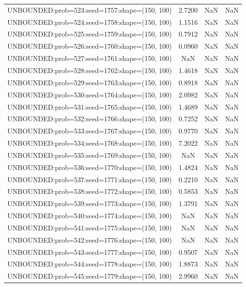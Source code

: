 \begin{longtable}{lccc}
UNBOUNDED:prob=523:seed=1757:shape=(150, 100) &  2.7200 &   NaN &    NaN \\
UNBOUNDED:prob=524:seed=1758:shape=(150, 100) &  1.1516 &   NaN &    NaN \\
UNBOUNDED:prob=525:seed=1759:shape=(150, 100) &  0.7912 &   NaN &    NaN \\
UNBOUNDED:prob=526:seed=1760:shape=(150, 100) &  0.0960 &   NaN &    NaN \\
UNBOUNDED:prob=527:seed=1761:shape=(150, 100) &     NaN &   NaN &    NaN \\
UNBOUNDED:prob=528:seed=1762:shape=(150, 100) &  1.4618 &   NaN &    NaN \\
UNBOUNDED:prob=529:seed=1763:shape=(150, 100) &  0.8918 &   NaN &    NaN \\
UNBOUNDED:prob=530:seed=1764:shape=(150, 100) &  2.0982 &   NaN &    NaN \\
UNBOUNDED:prob=531:seed=1765:shape=(150, 100) &  1.4689 &   NaN &    NaN \\
UNBOUNDED:prob=532:seed=1766:shape=(150, 100) &  0.7252 &   NaN &    NaN \\
UNBOUNDED:prob=533:seed=1767:shape=(150, 100) &  0.9770 &   NaN &    NaN \\
UNBOUNDED:prob=534:seed=1768:shape=(150, 100) &  7.2022 &   NaN &    NaN \\
UNBOUNDED:prob=535:seed=1769:shape=(150, 100) &     NaN &   NaN &    NaN \\
UNBOUNDED:prob=536:seed=1770:shape=(150, 100) &  1.4824 &   NaN &    NaN \\
UNBOUNDED:prob=537:seed=1771:shape=(150, 100) &  0.2210 &   NaN &    NaN \\
UNBOUNDED:prob=538:seed=1772:shape=(150, 100) &  0.5853 &   NaN &    NaN \\
UNBOUNDED:prob=539:seed=1773:shape=(150, 100) &  1.3791 &   NaN &    NaN \\
UNBOUNDED:prob=540:seed=1774:shape=(150, 100) &     NaN &   NaN &    NaN \\
UNBOUNDED:prob=541:seed=1775:shape=(150, 100) &     NaN &   NaN &    NaN \\
UNBOUNDED:prob=542:seed=1776:shape=(150, 100) &     NaN &   NaN &    NaN \\
UNBOUNDED:prob=543:seed=1777:shape=(150, 100) &  0.9507 &   NaN &    NaN \\
UNBOUNDED:prob=544:seed=1778:shape=(150, 100) &  1.8873 &   NaN &    NaN \\
UNBOUNDED:prob=545:seed=1779:shape=(150, 100) &  2.9960 &   NaN &    NaN \\

\end{longtable}
